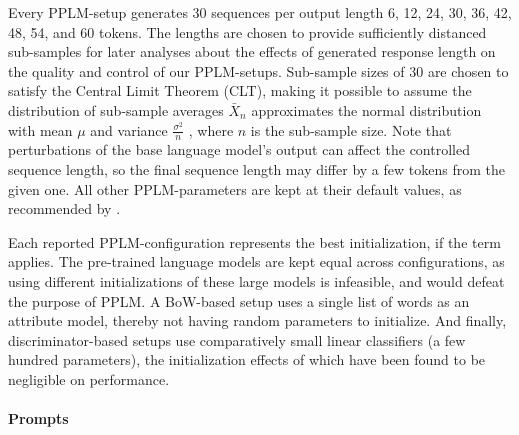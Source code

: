 
Every PPLM-setup generates 30 sequences per output length 6, 12, 24, 30, 36, 42, 48, 54, and 60 tokens. 
The lengths are chosen to provide sufficiently distanced sub-samples for later analyses about the effects of generated response length on the quality and control of our PPLM-setups.
Sub-sample sizes of 30 are chosen to satisfy the Central Limit Theorem (CLT), making it possible to assume the distribution of sub-sample averages $\bar{X}_n$ approximates the normal distribution with mean $\mu$ and variance $\frac{\sigma^2}{n}$ \citep{CLT2008springer}, where $n$ is the sub-sample size.
Note that perturbations of the base language model's output can affect the controlled sequence length, so the final sequence length may differ by a few tokens from the given one. All other PPLM-parameters are kept at their default values, as recommended by \cite{dathathri2019plug}. 

Each reported PPLM-configuration represents the best initialization, if the term applies. The pre-trained language models are kept equal across configurations, as using different initializations of these large models is infeasible, and would defeat the purpose of PPLM. A BoW-based setup uses a single list of words as an attribute model, thereby not having random parameters to initialize. And finally, discriminator-based setups use comparatively small linear classifiers (a few hundred parameters), the initialization effects of which have been found to be negligible on performance.


\paragraph{Prompts}

